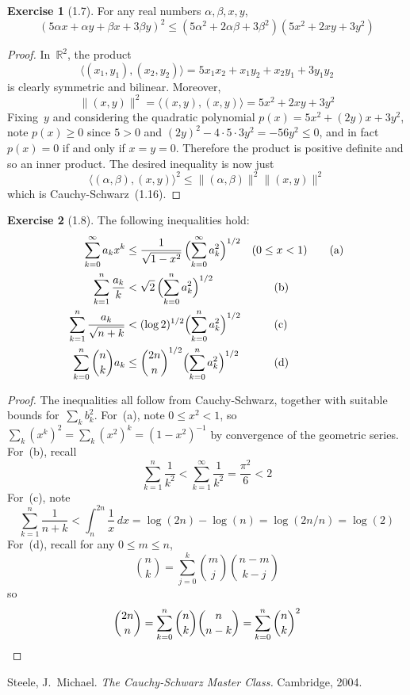 \documentclass[letterpaper,12pt]{article}
\newcommand{\CS}{Cauchy-Schwarz}
\newcommand{\R}{\mathbb{R}}
\newcommand{\mult}{\cdot}
\newcommand{\dx}{\,dx}
\newcommand{\Biglp}[1]{\Bigl({#1}\Bigr)}
\newcommand{\innerprod}[2]{\langle{#1},{#2}\rangle}
\newcommand{\norm}[1]{\lVert{#1}\rVert}
\theoremstyle{definition}
\newtheorem*{exer}{Exercise}
\theoremstyle{remark}
\begin{document}
\begin{exer}[1.7]
For any real numbers \(\alpha,\beta,x,y\),
\[(5\alpha x+\alpha y+\beta x+3\beta y)^2\le(5\alpha^2+2\alpha\beta+3\beta^2)(5x^2+2xy+3y^2)\]
\end{exer}
\begin{proof}
In~\(\R^2\), the product
\[\innerprod{(x_1,y_1)}{(x_2,y_2)}=5x_1x_2+x_1y_2+x_2y_1+3y_1y_2\]
is clearly symmetric and bilinear. Moreover,
\[\norm{(x,y)}^2=\innerprod{(x,y)}{(x,y)}=5x^2+2xy+3y^2\]
Fixing~\(y\) and considering the quadratic polynomial \(p(x)=5x^2+(2y)x+3y^2\), note \(p(x)\ge 0\) since \(5>0\) and \((2y)^2-4\mult 5\mult 3y^2=-56y^2\le 0\), and in fact \(p(x)=0\) if and only if \(x=y=0\). Therefore the product is positive definite and so an inner product. The desired inequality is now just
\[\innerprod{(\alpha,\beta)}{(x,y)}^2\le\norm{(\alpha,\beta)}^2\norm{(x,y)}^2\]
which is \CS~(1.16).
\end{proof}

\begin{exer}[1.8]
The following inequalities hold:
\begin{align*}
\sum_{k=0}^{\infty}a_k x^k&\le\frac{1}{\sqrt{1-x^2}}\,\Biglp{\sum_{k=0}^{\infty}a_k^2}^{1/2}&&(0\le x<1)\tag{a}\\
\sum_{k=1}^n\frac{a_k}{k}&<\sqrt{2}\,\Biglp{\sum_{k=0}^n a_k^2}^{1/2}&&\tag{b}\\
\sum_{k=1}^n\frac{a_k}{\sqrt{n+k}}&<(\log{2})^{1/2}\Biglp{\sum_{k=0}^n a_k^2}^{1/2}&&\tag{c}\\
\sum_{k=0}^n\binom{n}{k}a_k&\le\binom{2n}{n}^{1/2}\Biglp{\sum_{k=0}^n a_k^2}^{1/2}&&\tag{d}
\end{align*}
\end{exer}
\begin{proof}
The inequalities all follow from \CS, together with suitable bounds for~\(\sum_k b_k^2\).
For~(a), note \(0\le x^2<1\), so \(\sum_k (x^k)^2=\sum_k (x^2)^k=(1-x^2)^{-1}\) by convergence of the geometric series. For~(b), recall
\[\sum_{k=1}^n\frac{1}{k^2}<\sum_{k=1}^{\infty}\frac{1}{k^2}=\frac{\pi^2}{6}<2\]
For~(c), note
\[\sum_{k=1}^n\frac{1}{n+k}<\int_n^{2n}\frac{1}{x}\dx=\log(2n)-\log(n)=\log(2n/n)=\log(2)\]
For~(d), recall for any \(0\le m\le n\),
\[\binom{n}{k}=\sum_{j=0}^k\binom{m}{j}\binom{n-m}{k-j}\]
so
\[\binom{2n}{n}=\sum_{k=0}^n\binom{n}{k}\binom{n}{n-k}=\sum_{k=0}^n\binom{n}{k}^2\qedhere\]
\end{proof}

\begin{thebibliography}{0}
 Steele, J.~Michael. \textit{The Cauchy-Schwarz Master Class.} Cambridge, 2004.
\end{thebibliography}
\end{document}
